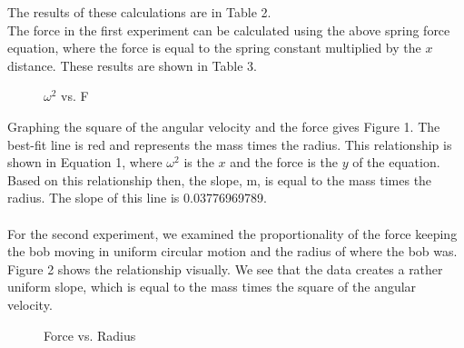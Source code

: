 \documentclass [12pt, letterpaper, twoside] {article}
\begin{document}
\noindent
The results of these calculations are in Table 2. \\

\noindent
The force in the first experiment can be calculated using the above spring force equation, where the force is equal to the spring constant multiplied by the \(x\) distance. These results are shown in Table 3.

\begin {figure}
  \centering
  \caption {\(\omega^2\) vs. F}
\end {figure}

\noindent
Graphing the square of the angular velocity and the force gives Figure 1. The best-fit line is red and represents the mass times the radius. This relationship is shown in Equation 1, where \(\omega^2\) is the \(x\) and the force is the \(y\) of the equation. Based on this relationship then, the slope, m, is equal to the mass times the radius. The slope of this line is 0.03776969789. \\\\
For the second experiment, we examined the proportionality of the force keeping the bob moving in uniform circular motion and the radius of where the bob was. Figure 2 shows the relationship visually. We see that the data creates a rather uniform slope, which is equal to the mass times the square of the angular velocity.

\begin {figure}
  \centering
  \caption {Force vs. Radius}
\end {figure}
\end{document}
